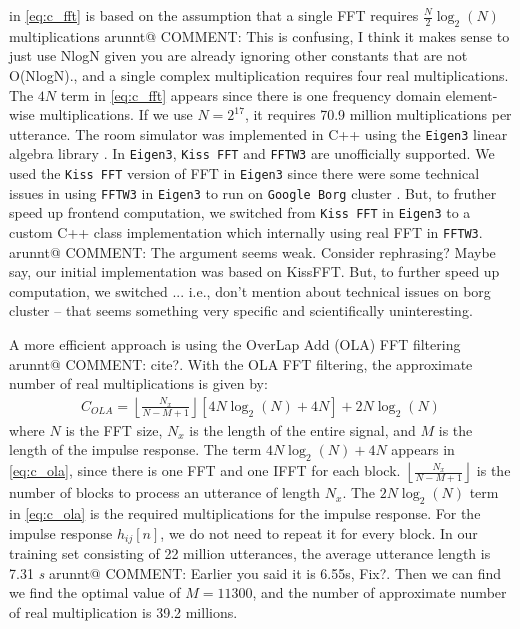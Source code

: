 \documentclass{article}
\makeatletter
\newcommand{\AR}[1]{{\color{red} arunnt@ COMMENT: #1}}
\makeatother
\begin{document}
in \eqref{eq:c_fft} is based on the assumption that a single FFT 
requires $\frac{N}{2} \log_2(N)$ multiplications \AR{This is confusing, I think it makes sense to just use NlogN given you are already ignoring other constants that are not O(NlogN).}, and a single
complex multiplication requires four real multiplications. The $4N$
term in \eqref{eq:c_fft} appears since there is one frequency domain
element-wise multiplications.
If we use $N = 2 ^ {17}$, it requires 70.9 million multiplications
per utterance. The room simulator was implemented in C++ using
the \texttt{Eigen3} linear algebra library \cite{eigenweb}.
In \texttt{Eigen3}, \texttt{Kiss FFT} \cite{M_Borgerding_kiss_fft_2010} and \texttt{FFTW3}
\cite{M_Frigo_proceedings_of_the_ieee_20015} are unofficially supported.
We used the \texttt{Kiss FFT} version of FFT in \texttt{Eigen3} since
there were some technical issues in using \texttt{FFTW3} in \texttt{Eigen3}
to run on \texttt{Google Borg} cluster \cite{A_Verma_eurosys_2015_1}.
But, to fruther speed up frontend computation, we switched from
\texttt{Kiss FFT} in \texttt{Eigen3} to a custom  C++ class
implementation which internally using real FFT in \texttt{FFTW3}.
\AR{The argument seems weak. Consider rephrasing? Maybe say, our initial implementation was based on KissFFT. But, to further speed up computation, we switched ... i.e., don't mention about technical issues on borg cluster -- that seems something very specific and scientifically uninteresting.}

A more efficient approach is using the OverLap Add (OLA)
FFT filtering \AR{cite?}. With the OLA FFT filtering,
the approximate number of real multiplications is given by:
\begin{align}
  C_{\textit{OLA}} =  \left \lfloor{\frac{N_x}{N - M + 1}}\right \rfloor
  \left[4 N \log_2(N) + 4 N  \right] + 2 N \log_2(N)
  \label{eq:c_ola}
\end{align}
where $N$ is the FFT size, $N_x$ is the length of the entire
signal, and $M$ is the length of the impulse response. The term
$4 N \log_2(N) + 4 N $ appears in \eqref{eq:c_ola}, since there is
one FFT and one IFFT for each block. 
$\left \lfloor{\frac{N_x}{N - M + 1}}\right \rfloor$
is the number of blocks to process an utterance of length $N_x$.
The $2 N \log_2(N)$ term in \eqref{eq:c_ola} is the required multiplications
for the impulse response. For the impulse response $h_{ij}[n]$, we do not
need to repeat it for every block.
In our training set consisting of 22 million utterances, the
average utterance length is 7.31 \textit{s} \AR{Earlier you said it is 6.55s, Fix?}.
Then we can find we find the optimal value of $M = 11300$, and the
number of approximate number of real multiplication is 39.2 millions.
%
%
%
%
\end{document}
